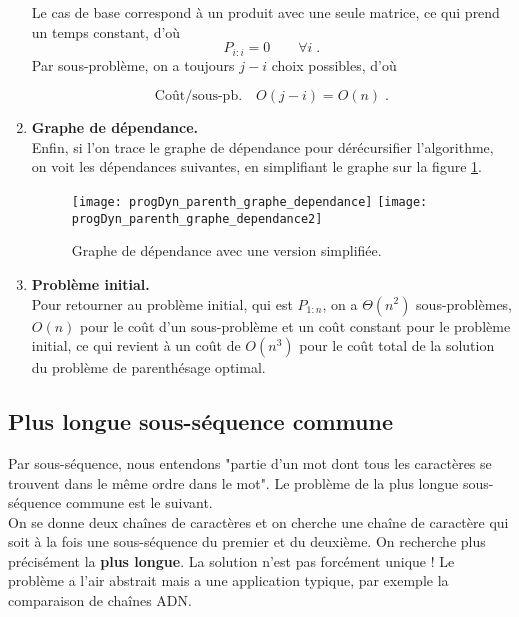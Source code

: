 \documentclass[12pt,a4paper]{book}
\begin{document}
\begin{enumerate}
Le cas de base correspond à un produit avec une seule matrice, ce qui prend un temps constant, d'où $$P_{i:i} = 0 \qquad \forall i \; .$$
Par sous-problème, on a toujours $j-i$ choix possibles, d'où

$$\boxed{\text{Coût/sous-pb.} \quad O(j-i) = O(n)} \; .$$

\item \textbf{Graphe de dépendance.} \\
Enfin, si l'on trace le graphe de dépendance pour dérécursifier l'algorithme, on voit les dépendances suivantes, en simplifiant le graphe sur la figure \ref{fig:progDyn_parenth_graphe_dependance}. \\
\begin{figure}[h]

\texttt{[image: progDyn\_parenth\_graphe\_dependance]} \hspace{1cm} \texttt{[image: progDyn\_parenth\_graphe\_dependance2]}
\caption{Graphe de dépendance avec une version simplifiée.}
\label{fig:progDyn_parenth_graphe_dependance}
\end{figure}

\item \textbf{Problème initial.} \\
Pour retourner au problème initial, qui est $P_{1:n}$, on a $\Theta(n^2)$ sous-problèmes, $O(n)$ pour le coût d'un sous-problème et un coût constant pour le problème initial, ce qui revient à un coût de $O(n^3)$ pour le coût total de la solution du problème de parenthésage optimal.
\end{enumerate}
\subsection{Plus longue sous-séquence commune}
Par sous-séquence, nous entendons "partie d'un mot dont tous les caractères se trouvent dans le même ordre dans le mot". Le problème de la plus longue sous-séquence commune est le suivant. \\

On se donne deux chaînes de caractères et on cherche une chaîne de caractère qui soit à la fois une sous-séquence du premier et du deuxième. On recherche plus précisément la \textbf{plus longue}. La solution n'est pas forcément unique ! Le problème a l'air abstrait mais a une application typique, par exemple la comparaison de chaînes ADN.
\end{document}

